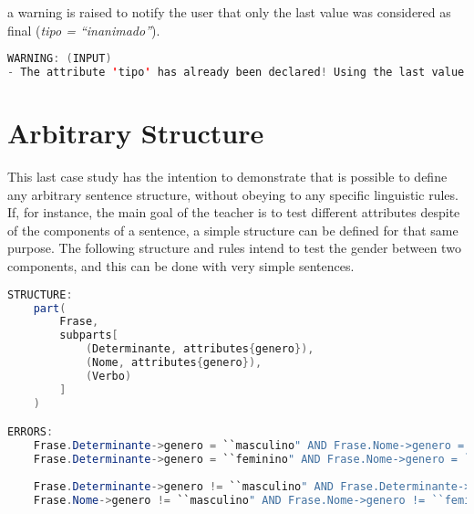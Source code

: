 \noindent a warning is raised to notify the user that only the last value was considered as final (\emph{tipo = ``inanimado''}).

\begin{center}
\begin{minipage}{14cm}
\begin{lstlisting}[language=java, basicstyle=\small, label={lst:meta_input_missing_attr_warn}, caption=Example warning message of same attribute in a single component]
WARNING: (INPUT) 
- The attribute 'tipo' has already been declared! Using the last value found.
\end{lstlisting}
\end{minipage}
\end{center}

\section{Arbitrary Structure}

This last case study has the intention to demonstrate that is possible to define any arbitrary sentence structure, without obeying to any specific linguistic rules. If, for instance, the main goal of the teacher is to test
different attributes despite of the components of a sentence, a simple structure can be defined for that same purpose. The following structure and rules intend to test the gender between two components, and this can be done 
with very simple sentences.

\begin{center}
\begin{minipage}{15cm}
\begin{lstlisting}[language=java, basicstyle=\tiny, label={lst:arbitrary_structure}, caption=Example of an arbitrary sentence structure]
STRUCTURE:
    part(
        Frase,
        subparts[
            (Determinante, attributes{genero}),
            (Nome, attributes{genero}),
            (Verbo)
        ]
    )

ERRORS:
    Frase.Determinante->genero = ``masculino" AND Frase.Nome->genero = ``feminino";
    Frase.Determinante->genero = ``feminino" AND Frase.Nome->genero = ``masculino";
    
    Frase.Determinante->genero != ``masculino" AND Frase.Determinante->genero != ``feminino";
    Frase.Nome->genero != ``masculino" AND Frase.Nome->genero != ``feminino";
\end{lstlisting}
\end{minipage}
\end{center}

